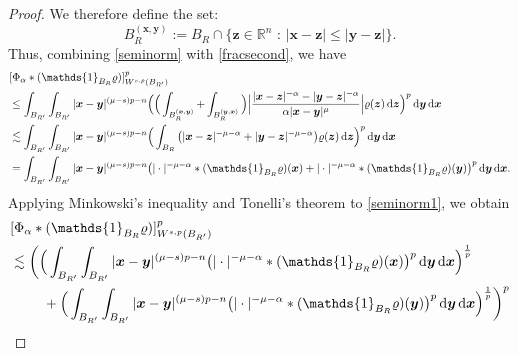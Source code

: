 \documentclass[reqno,11pt]{amsart}
\numberwithin{equation}{section}
\theoremstyle{definition}
\def\dd{{\, \rm d}}
\begin{document}
\begin{proof}
We therefore define the set:
 \[
 B^{(\boldsymbol{x},\boldsymbol{y})}_R := B_R 
 \cap \{ \boldsymbol{z} \in \mathbb{R}^n \,\,: \, |\boldsymbol{x} - \boldsymbol{z}| \leq |\boldsymbol{y} - \boldsymbol{z}|\}.  \]
Thus, combining \eqref{seminorm} with \eqref{fracsecond}, we have
    \begin{align}\label{seminorm1}
 \begin{split}
  & [\Phi_\alpha*(\mathds{1}_{B_R}\varrho)]_{W^{s,p}(B_{R'})}^p \\
 & \leq \int_{B_{R'}} \int_{B_{R'}} |\boldsymbol{x} - \boldsymbol{y}|^{(\mu -s)p - n} \Big( \Big( \int_{B^{(\boldsymbol{x},\boldsymbol{y})}_R} + \int_{B^{(\boldsymbol{y},\boldsymbol{x})}_R} \Big) \Big| \frac{|\boldsymbol{x} - \boldsymbol{z}|^{-\alpha} - |\boldsymbol{y} - \boldsymbol{z}|^{-\alpha}}{\alpha |\boldsymbol{x} - \boldsymbol{y}|^{\mu}} \Big| \varrho(\boldsymbol{z}) \dd \boldsymbol{z} \Big)^p \dd \boldsymbol{y} \dd \boldsymbol{x} \\
 & \lesssim \int_{B_{R'}} \int_{B_{R'}} |\boldsymbol{x} - \boldsymbol{y}|^{(\mu -s)p - n} 
 \Big( \int_{B_R} \big (|\boldsymbol{x} - \boldsymbol{z}|^{-\mu - \alpha} + |\boldsymbol{y} - \boldsymbol{z}|^{-\mu - \alpha} \big )\varrho(\boldsymbol{z}) \dd \boldsymbol{z} \Big)^p \dd \boldsymbol{y} \dd \boldsymbol{x} \\
 & = \int_{B_{R'}} \int_{B_{R'}} |\boldsymbol{x} - \boldsymbol{y}|^{(\mu -s)p - n} \big ( |\cdot|^{-\mu - \alpha}*(\mathds{1}_{B_R}\varrho) (\boldsymbol{x}) + |\cdot|^{-\mu - \alpha}*(\mathds{1}_{B_R}\varrho) (\boldsymbol{y}) \big )^p \dd \boldsymbol{y} \dd \boldsymbol{x}.
 \end{split}
 \end{align}
 Applying Minkowski's inequality and Tonelli's theorem to \eqref{seminorm1}, we obtain
\begin{align}\label{seminorm2}
 \begin{split}
 & [\Phi_\alpha*(\mathds{1}_{B_R}\varrho)]_{W^{s,p}(B_{R'})}^p \\
& \lesssim \bigg ( \Big( \int_{B_{R'}} \int_{B_{R'}} |\boldsymbol{x} - \boldsymbol{y}|^{(\mu -s)p - n} \big ( |\cdot|^{-\mu - \alpha}*(\mathds{1}_{B_R}\varrho) (\boldsymbol{x}) \big )^p \dd \boldsymbol{y} \dd \boldsymbol{x} \Big)^\frac{1}{p} \\
 & \qquad\,\, + \Big( \int_{B_{R'}} \int_{B_{R'}} |\boldsymbol{x} - \boldsymbol{y}|^{(\mu -s)p - n} \big ( |\cdot|^{-\mu - \alpha}*(\mathds{1}_{B_R}\varrho) (\boldsymbol{y}) \big )^p \dd \boldsymbol{y} \dd \boldsymbol{x} \Big)^\frac{1}{p} \bigg )^p \\

\end{split}
\end{align}
\end{proof}
\end{document}
